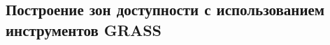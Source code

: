 \documentclass[ignorenonframetext,russian,hyperref={pdftex,unicode}]{beamer}        %
\begin{document}

    \subsection{Построение зон доступности с использованием инструментов GRASS}
    


\mode*
\end{document}
